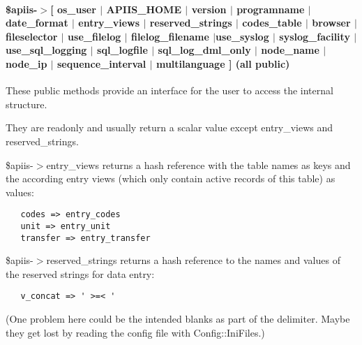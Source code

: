 \paragraph*{\$apiis-$>$[ os\_user $|$ APIIS\_HOME $|$ version $|$ programname $|$ date\_format $|$ entry\_views $|$ reserved\_strings $|$ codes\_table $|$ browser $|$ fileselector $|$ use\_filelog $|$ filelog\_filename $|$use\_syslog $|$ syslog\_facility $|$ use\_sql\_logging $|$ sql\_logfile $|$ sql\_log\_dml\_only $|$ node\_name $|$ node\_ip $|$ sequence\_interval $|$ multilanguage ] (all public)\label{Apiis::Init_--_Basic_initialisation_object_for_the_complete_APIIS_structure__apiis-_os_user_APIIS_HOME_version_programname_date_format_entry_views_reserved_strings_codes_table_browser_fileselector_use_filelog_filelog_filename_use_syslog_syslog_facility_use_sql_logging_sql_logfile_sql_log_dml_only_node_name_node_ip_sequence_interval_multilanguage_all_public_}}


These public methods provide an interface for the user to access the
internal structure.



They are readonly and usually return a scalar value except entry\_views and
reserved\_strings.



\$apiis-$>$entry\_views returns a hash reference with the table names as keys
and the according entry views (which only contain active records of this
table) as values:

\begin{verbatim}
   codes => entry_codes
   unit => entry_unit
   transfer => entry_transfer
\end{verbatim}


\$apiis-$>$reserved\_strings returns a hash reference to the names and values
of the reserved strings for data entry:

\begin{verbatim}
   v_concat => ' >=< '
\end{verbatim}


(One problem here could be the intended blanks as part of the delimiter.
 Maybe they get lost by reading the config file with Config::IniFiles.)

